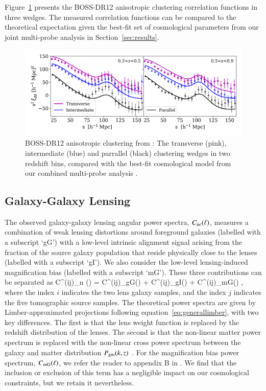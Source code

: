 Figure~\ref{fig:wedges} presents the \citet{sanchez/etal:2017} BOSS-DR12 anisotropic clustering correlation functions in three wedges.   The measured correlation functions can be compared to the theoretical expectation given the best-fit set of cosmological parameters from our joint multi-probe analysis in Section~\ref{sec:results}.

\begin{figure}
        \includegraphics[width=\textwidth]{Data_Plots/clustering_wedges/BOSS_Sanchez_wedges.png}
        \caption{BOSS-DR12 anisotropic clustering from \citet{sanchez/etal:2017}:
          The transverse (pink), intermediate (blue) and parrallel
          (black) clustering wedges in two redshift bins, compared 
          with the best-fit
          cosmological model from our combined multi-probe analysis
          .}
        \label{fig:wedges}
\end{figure}

\subsection{Galaxy-Galaxy Lensing}
\label{sec:GGL}
The observed galaxy-galaxy lensing angular power spectra, $C_{\rm n \epsilon}(\ell)$, measures a combination of weak lensing distortions around foreground galaxies (labelled with a subscript `gG') with a low-level intrinsic alignment signal arising from the fraction of the source galaxy population that reside physically close to the lenses (labelled with a subscript `gI').   We also consider the low-level lensing-induced magnification bias (labelled with a subscript `mG').   These three contributions can be separated as 
\be
\label{eq:cl_ggl}
C^{(ij)}_{\rm n \epsilon}(\ell) = C^{(ij)}_{\rm gG}(\ell) +
C^{(ij)}_{\rm gI}(\ell) + C^{(ij)}_{\rm mG}(\ell)  \;,
\ee
where the index $i$ indicates the two lens galaxy samples, and the index $j$ indicates the five tomographic source samples.   The theoretical power spectra are given by Limber-approximated projections following equation~\ref{eq:generallimber}, with two key differences.   The first is that the lens weight function is replaced by the redshift distribution of the lenses.   The second is that the non-linear matter power spectrum is replaced with the non-linear cross power spectrum between the galaxy and matter distribution $P_{\rm gm}(k,z)$ \citep[see equations 24 and 25 of][for the full expressions]{joachimi/etal:inprep}.   For the magnification bias power spectrum, $C_{\rm mG}(\ell)$, we refer the reader to appendix B in \citet{joachimi/etal:inprep}.   We find that the inclusion or exclusion of this term has a negligible impact on our cosmological constraints, but we retain it nevertheless.

